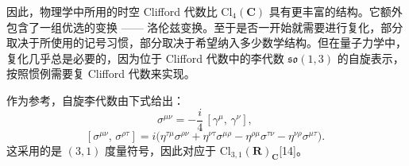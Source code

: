 因此，物理学中所用的时空 Clifford 代数比 $\mathrm{Cl}_4(\mathbf{C})$ 具有更丰富的结构。它额外包含了一组优选的变换 —— 洛伦兹变换。至于是否一开始就需要进行复化，部分取决于所使用的记号习惯，部分取决于希望纳入多少数学结构。但在量子力学中，复化几乎总是必要的，因为位于 Clifford 代数中的李代数 $\mathfrak{so}(1,3)$ 的自旋表示，按照惯例需要复 Clifford 代数来实现。

作为参考，自旋李代数由下式给出：
$$
\sigma^{\mu\nu} = -\frac{i}{4}\,[\gamma^\mu,\, \gamma^\nu], ~
$$
$$
[\sigma^{\mu\nu},\, \sigma^{\rho\tau}] = i \big( \eta^{\tau\mu}\sigma^{\rho\nu} + \eta^{\nu\tau}\sigma^{\mu\rho} - \eta^{\rho\mu}\sigma^{\tau\nu} - \eta^{\nu\rho}\sigma^{\mu\tau} \big).~
$$
这采用的是 $(3,1)$ 度量符号，因此对应于 $\mathrm{Cl}_{3,1}(\mathbf{R})_{\mathbf{C}}$[14]。

